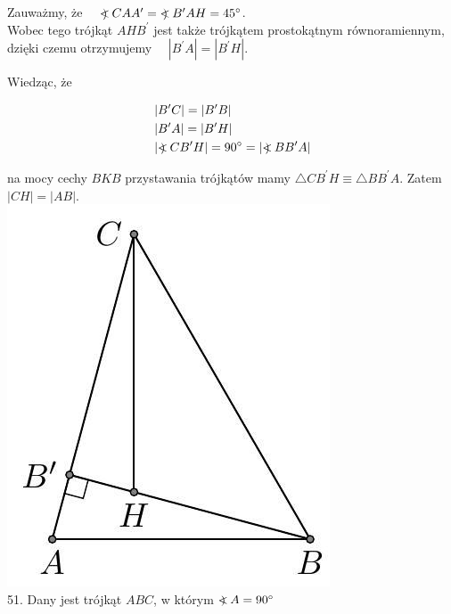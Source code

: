 \documentclass[10pt]{article}
\newcommand\Varangle{\mathop{{<\!\!\!\!\!\text{\small)}}\:}\nolimits}
\begin{document}
Zauważmy, że \(\quad \Varangle C A A^{\prime}=\Varangle B^{\prime} A H=45^{\circ}\).\\
Wobec tego trójkąt \(A H B^{\prime}\) jest także trójkątem prostokątnym równoramiennym, dzięki czemu otrzymujemy \(\quad\left|B^{\prime} A\right|=\left|B^{\prime} H\right|\).

Wiedząc, że

\[
\begin{aligned}
& \left|B^{\prime} C\right|=\left|B^{\prime} B\right| \\
& \left|B^{\prime} A\right|=\left|B^{\prime} H\right| \\
& \left|\Varangle C B^{\prime} H\right|=90^{\circ}=\left|\Varangle B B^{\prime} A\right|
\end{aligned}
\]

na mocy cechy \(B K B\) przystawania trójkątów mamy \(\triangle C B^{\prime} H \equiv \triangle B B^{\prime} A\). Zatem \(|C H|=|A B|\).\\
\includegraphics[max width=\textwidth, center]{2024_11_21_71f62bd117d375398909g-055(2)}\\
51. Dany jest trójkąt \(A B C\), w którym \(\Varangle A=90^{\circ}\)\\
\end{document}
